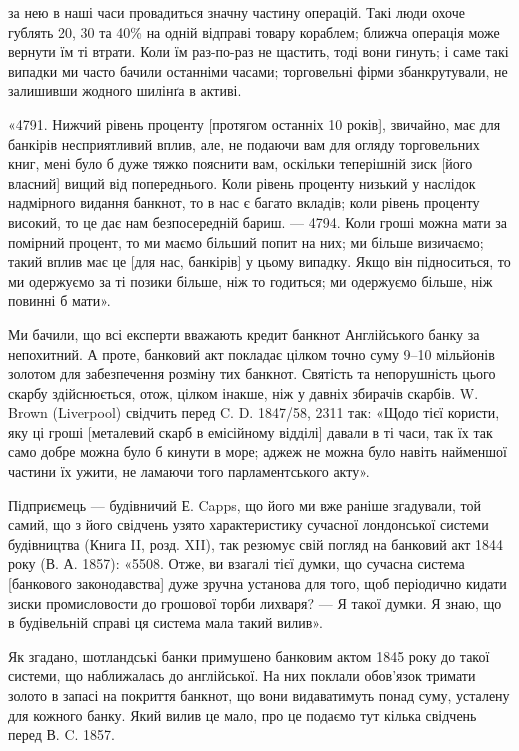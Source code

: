 \parcont{}  %
за нею в наші часи провадиться значну частину операцій. Такі люди охоче
гублять 20, 30 та 40\% на одній відправі товару кораблем; ближча операція
може вернути їм ті втрати. Коли їм раз-по-раз не щастить, тоді вони гинуть;
і саме такі випадки ми часто бачили останніми часами; торговельні фірми
збанкрутували, не залишивши жодного шилінґа в активі.

«4791. Нижчий рівень проценту [протягом останніх 10 років], звичайно,
має для банкірів несприятливий вплив, але, не подаючи вам для огляду торговельних
книг, мені було б дуже тяжко пояснити вам, оскільки теперішній
зиск [його власний] вищий від попереднього. Коли рівень проценту низький у
наслідок надмірного видання банкнот, то в нас є багато вкладів; коли рівень
проценту високий, то це дає нам безпосередній бариш. — 4794. Коли гроші можна
мати за помірний процент, то ми маємо більший попит на них; ми більше
визичаємо; такий вплив має це [для нас, банкірів] у цьому випадку. Якщо він
підноситься, то ми одержуємо за ті позики більше, ніж то годиться; ми одержуємо
більше, ніж повинні б мати».

Ми бачили, що всі експерти вважають кредит банкнот Англійського банку
за непохитний. А проте, банковий акт покладає цілком точно суму 9--10
мільйонів золотом для забезпечення розміну тих банкнот. Святість та непорушність
цього скарбу здійснюється, отож, цілком інакше, ніж у давніх збирачів
скарбів. W. Brown (Liverpool) свідчить перед C. D. 1847/58, 2311 так: «Щодо
тієї користи, яку ці гроші [металевий скарб в емісійному відділі] давали в ті
часи, так їх так само добре можна було б кинути в море; аджеж не можна було
навіть найменшої частини їх ужити, не ламаючи того парламентського акту».

Підприємець — будівничий Е. Capps, що його ми вже раніше згадували,
той самий, що з його свідчень узято характеристику сучасної лондонської системи
будівництва (Книга II, розд. XII), так резюмує свій погляд на банковий
акт 1844 року (В. А. 1857): «5508. Отже, ви взагалі тієї думки, що сучасна
система [банкового законодавства] дуже зручна установа для того, щоб періодично
кидати зиски промисловости до грошової торби лихваря? — Я такої думки.
Я знаю, що в будівельній справі ця система мала такий вилив».

Як згадано, шотландські банки примушено банковим актом 1845 року до
такої системи, що наближалась до англійської. На них поклали обов’язок тримати
золото в запасі на покриття банкнот, що вони видаватимуть понад суму,
усталену для кожного банку. Який вилив це мало, про це подаємо тут кілька
свідчень перед В. C. 1857.

